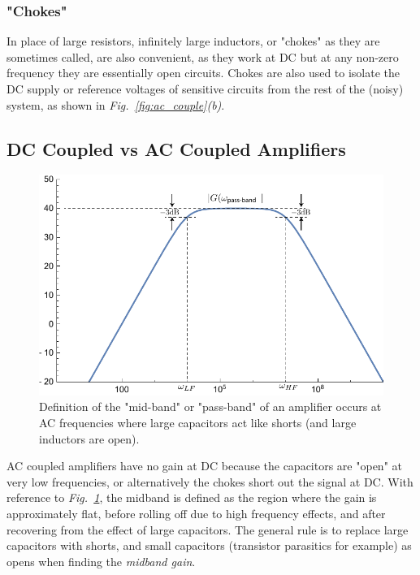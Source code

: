 \subsubsection{"Chokes"}
In place of large resistors, infinitely large inductors, or "chokes" as they are sometimes called, are also convenient, as they work at DC but at any non-zero frequency they are essentially open circuits.  Chokes are also used to isolate the DC supply or reference voltages of sensitive circuits from the rest of the (noisy) system, as shown in \emph{Fig.~\ref{fig:ac_couple}(b)}.
\subsection{DC Coupled vs AC Coupled Amplifiers}
\begin{figure}[tb]
\centering
\includegraphics[width=.6\columnwidth]{amp_bandpass}
\caption{Definition of the "mid-band" or "pass-band" of an amplifier occurs at AC frequencies where large capacitors act like shorts (and large inductors are open).}
\label{fig:midband}
\end{figure}
AC coupled amplifiers have no gain at DC because the capacitors are "open" at very low frequencies, or alternatively the chokes short out the signal at DC.  With reference to \emph{Fig.~\ref{fig:midband}}, the midband is defined as the region where the gain is approximately flat, before rolling off due to high frequency effects, and after recovering from the effect of large capacitors. The general rule is to replace large capacitors with shorts, and small capacitors (transistor parasitics for example) as opens when finding the \emph{midband gain}. 
